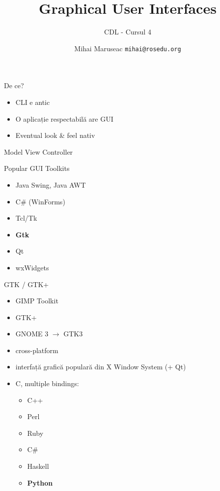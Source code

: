 \documentclass{beamer}
\title[GUI]{Graphical User Interfaces}
\subtitle{CDL - Cursul 4}
\institute[ROSEdu]{ROSEdu}
\author[MM]{Mihai Maruseac \texttt{mihai@rosedu.org}}
\begin{document}
\maketitle

\begin{frame}{De ce?}
  \begin{itemize}
    \item CLI e antic
    \item O aplicație respectabilă are GUI
    \item Eventual look \& feel nativ
  \end{itemize}
\end{frame}

\begin{frame}{Model View Controller}
  \begin{center}
  \end{center}
\end{frame}

\begin{frame}{Popular GUI Toolkits}
  \begin{itemize}
    \item Java Swing, Java AWT
    \item C\# (WinForms)
    \item Tcl/Tk
    \item \textbf{Gtk}
    \item Qt
    \item wxWidgets
  \end{itemize}
\end{frame}

\begin{frame}{GTK / GTK+}
  \begin{itemize}
    \item GIMP Toolkit
    \item GTK+
    \item GNOME 3 $\rightarrow$ GTK3
    \item cross-platform
    \item interfață grafică populară din X Window System (+ Qt)
    \item C, multiple bindings:
      \begin{itemize}
        \item C++
        \item Perl
        \item Ruby
        \item C\#
        \item Haskell
        \item \textbf{Python}
      \end{itemize}
  \end{itemize}
\end{frame}
\end{document}
